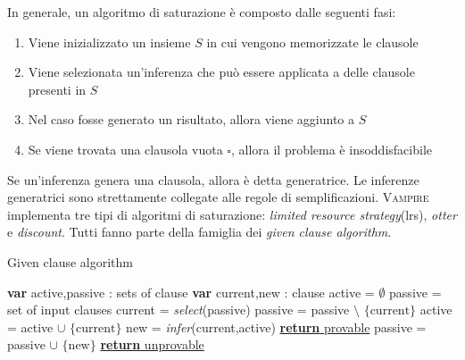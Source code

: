 In generale, un algoritmo di saturazione è composto dalle seguenti fasi:
\begin{enumerate}
    \item Viene inizializzato un insieme $S$ in cui vengono memorizzate le clausole
    \item Viene selezionata un'inferenza che può essere applicata a delle clausole presenti in $S$
    \item Nel caso fosse generato un risultato, allora viene aggiunto a $S$
    \item Se viene trovata una clausola vuota $\square$, allora il problema è insoddisfacibile
\end{enumerate}
Se un'inferenza genera una clausola, allora è detta generatrice. Le inferenze generatrici 
sono strettamente collegate alle regole di semplificazioni.
\textsc{Vampire} implementa tre tipi di algoritmi di saturazione: \emph{limited resource strategy}(lrs), \emph{otter} e \emph{discount}.
Tutti fanno parte della famiglia dei \emph{given clause algorithm}.
\begin{algorithm}
    \caption{Given clause algorithm}
    \begin{algorithmic}[1]
        \State \textbf{var} active,passive : sets of clause 
        \State \textbf{var} current,new : clause
        \State active = $\emptyset$
        \State passive = set of input clauses
            \State current = \emph{select}(passive)
            \State passive = passive $\setminus$ $\{\text{current}\}$
            \State active = active $\cup$ $\{\text{current}\}$
            \State new = \emph{infer}(current,active)
                \State \underline{\textbf{return} provable}
            \EndIf
            \State passive = passive $\cup$ $\{\text{new}\}$ 
        \EndWhile
        \State \underline{\textbf{return} unprovable}
    \end{algorithmic}
\end{algorithm}
\cite{kovacs2013first,riazanov2002design,reger2016new}